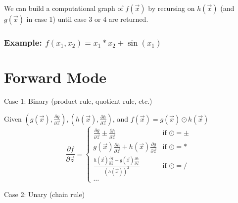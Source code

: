 \documentclass[a0,landscape]{a0poster}
\begin{document}
\begin{multicols}{4}
We can build a computational graph of $f(\vec{x})$ by recursing on $h(\vec{x})$ (and $g(\vec{x})$ in case 1) until case 3 or 4 are returned.

\subsubsection*{Example: $f(x_1,x_2)=x_1*x_2+\sin{(x_1)}$}

\begin{center}
\end{center}

\section*{Forward Mode}
Case 1: Binary (product rule, quotient rule, etc.) 

    Given $\left(g(\vec{x}),\frac{\partial g}{\partial\vec{z}}\right),\left(h(\vec{x}),\frac{\partial h}{\partial\vec{z}}\right)$, and $f(\vec{x})=g(\vec{x})\odot h(\vec{x})$
    \begin{equation}
        \frac{\partial f}{\partial\vec{z}}=
            \begin{cases}
                \frac{\partial g}{\partial\vec{z}}\pm\frac{\partial h}{\partial\vec{z}} & \text{if } \odot = \pm\\
                g(\vec{x})\frac{\partial h}{\partial\vec{z}} + h(\vec{x})\frac{\partial g}{\partial\vec{z}} & \text{if } \odot = *\\
                \frac{h(\vec{x})\frac{\partial g}{\partial\vec{z}} - g(\vec{x})\frac{\partial h}{\partial\vec{z}}}{(h(\vec{x}))^2} & \text{if } \odot = /\\
                \dots
            \end{cases}
    \end{equation}

\vspace{10cm}
Case 2: Unary (chain rule)


\end{multicols}
\end{document}
